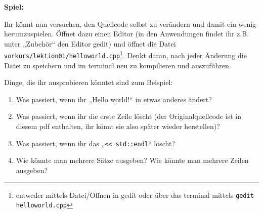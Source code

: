 
\textbf{Spiel:}

Ihr könnt nun versuchen, den Quellcode selbst zu verändern und damit ein wenig
herumzuspielen. Öffnet dazu einen Editor (in den Anwendungen findet ihr z.B.
unter „Zubehör“ den Editor gedit) und öffnet die Datei
\texttt{vorkurs/lektion01/helloworld.cpp}\footnote{entweder mittels
    \glqq{}Datei/Öffnen\grqq{} in gedit oder über das \Gls{terminal} mittels \texttt{gedit
        helloworld.cpp}}. Denkt daran, nach jeder Änderung die Datei zu speichern und
im \Gls{terminal} neu zu kompilieren und auszuführen.

Dinge, die ihr ausprobieren könntet sind zum Beispiel:
\begin{enumerate}
    \item Was passiert, wenn ihr „Hello world!“ in etwas anderes ändert?
    \item Was passiert, wenn ihr die erste Zeile löscht (der Originalquellcode
          ist in diesem pdf enthalten, ihr könnt sie also später wieder
          herstellen)?
    \item Was passiert, wenn ihr das „\verb|<< std::endl|“ löscht?
    \item Wie könnte man mehrere Sätze ausgeben? Wie könnte man mehrere Zeilen
          ausgeben?
\end{enumerate}
